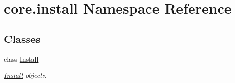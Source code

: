 \hypertarget{namespacecore_1_1install}{\section{core.\-install Namespace Reference}
\label{namespacecore_1_1install}
}
\subsection*{Classes}
\begin{DoxyCompactItemize}
\item 
class \hyperlink{classcore_1_1install_1_1Install}{Install}
\begin{DoxyCompactList}\small\item\em \hyperlink{classcore_1_1install_1_1Install}{Install} objects. \end{DoxyCompactList}\end{DoxyCompactItemize}
